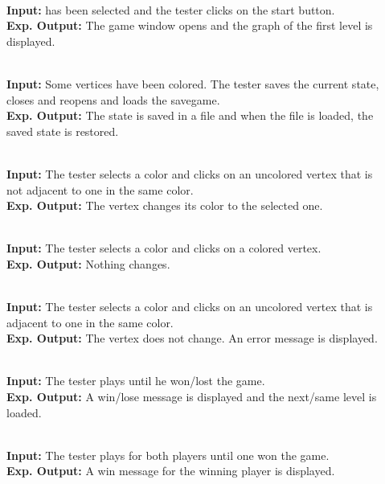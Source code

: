\begin{description}
	\item[] \textbf{} \\
	\textbf{Input:} \graphcoloring has been selected and the tester clicks on the start button. \\
	\textbf{Exp. Output:} The game window opens and the graph of the first level is displayed.
	
	\item[] \textbf{} \\
	\textbf{Input:} Some vertices have been colored. The tester saves the current state, closes and reopens \graphcoloring and loads the savegame. \\
	\textbf{Exp. Output:} The state is saved in a file and when the file is loaded, the saved state is restored.
	
	\item[] \textbf{} \\
	\textbf{Input:} The tester selects a color and clicks on an uncolored vertex that is not adjacent to one in the same color. \\
	\textbf{Exp. Output:} The vertex changes its color to the selected one.
	
	\item[] \textbf{} \\
	\textbf{Input:} The tester selects a color and clicks on a colored vertex. \\
	\textbf{Exp. Output:} Nothing changes.
	
	\item[] \textbf{} \\
	\textbf{Input:} The tester selects a color and clicks on an uncolored vertex that is adjacent to one in the same color. \\
	\textbf{Exp. Output:} The vertex does not change. An error message is displayed.
	
	\item[] \textbf{} \\
	\textbf{Input:} The tester plays until he won/lost the game. \\
	\textbf{Exp. Output:} A win/lose message is displayed and the next/same level is loaded.

	\item[] \textbf{} \\
	\textbf{Input:} The tester plays for both players until one won the game. \\
	\textbf{Exp. Output:} A win message for the winning player is displayed.
	
\end{description}

